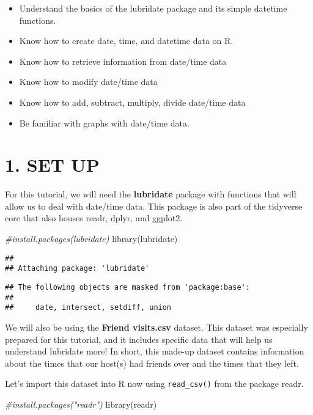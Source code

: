 \documentclass[
]{book}
\newenvironment{Shaded}{\begin{snugshade}}{\end{snugshade}}
\newcommand{\CommentTok}[1]{\textcolor[rgb]{0.56,0.35,0.01}{\textit{#1}}}
\newcommand{\FunctionTok}[1]{\textcolor[rgb]{0.00,0.00,0.00}{#1}}
\newcommand{\NormalTok}[1]{#1}
\providecommand{\tightlist}{%
  \setlength{\itemsep}{0pt}\setlength{\parskip}{0pt}}
\begin{document}
\begin{itemize}
\tightlist
\item
  Understand the basics of the lubridate package and its simple datetime functions.
\item
  Know how to create date, time, and datetime data on R.
\item
  Know how to retrieve information from date/time data
\item
  Know how to modify date/time data
\item
  Know how to add, subtract, multiply, divide date/time data
\item
  Be familiar with graphs with date/time data.
\end{itemize}

\hypertarget{set-up-3}{%
\section{1. SET UP}\label{set-up-3}}

For this tutorial, we will need the \textbf{lubridate} package with functions that will allow us to deal with date/time data. This package is also part of the tidyverse core that also houses readr, dplyr, and ggplot2.

\begin{Shaded}
\begin{Highlighting}[]
\CommentTok{\#install.packages(lubridate)}
\FunctionTok{library}\NormalTok{(lubridate)}
\end{Highlighting}
\end{Shaded}

\begin{verbatim}
## 
## Attaching package: 'lubridate'
\end{verbatim}

\begin{verbatim}
## The following objects are masked from 'package:base':
## 
##     date, intersect, setdiff, union
\end{verbatim}

We will also be using the \textbf{Friend visits.csv} dataset. This dataset was especially prepared for this tutorial, and it includes specific data that will help us understand lubridate more! In short, this made-up dataset contains information about the times that our host(s) had friends over and the times that they left.

Let's import this dataset into R now using \texttt{read\_csv()} from the package readr.

\begin{Shaded}
\begin{Highlighting}[]
\CommentTok{\#install.packages("readr")}
\FunctionTok{library}\NormalTok{(readr)}
\end{Highlighting}
\end{Shaded}
\end{document}
